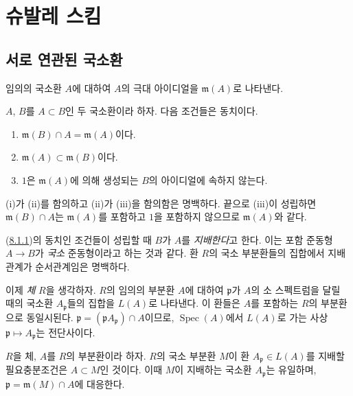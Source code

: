\section{슈발레 스킴}
\label{section:I.8-ko}

\subsection{서로 연관된 국소환}
\label{subsection:I.8.1-ko}

임의의 국소환 $A$에 대하여 $A$의 극대 아이디얼을
$\mathfrak m(A)$로 나타낸다.

\begin{lemma}[8.1.1]
\label{I.8.1.1-ko}
$A$, $B$를 $A\subset B$인 두 국소환이라 하자. 다음 조건들은
동치이다.
\begin{enumerate}
  \item[(i)] $\mathfrak m(B)\cap A=\mathfrak m(A)$이다.
  \item[(ii)] $\mathfrak m(A)\subset\mathfrak m(B)$이다.
  \item[(iii)] $1$은 $\mathfrak m(A)$에 의해 생성되는 $B$의
    아이디얼에 속하지 않는다.
\end{enumerate}
\end{lemma}

(i)가 (ii)를 함의하고 (ii)가 (iii)을 함의함은 명백하다. 끝으로
(iii)이 성립하면 $\mathfrak m(B)\cap A$는 $\mathfrak m(A)$를 포함하고
$1$을 포함하지 않으므로 $\mathfrak m(A)$와 같다.

(\hyperref[I.8.1.1-ko]{8.1.1})의 동치인 조건들이 성립할 때 $B$가
$A$를 \emph{지배한다}고 한다. 이는 포함 준동형 $A\to B$가
\emph{국소} 준동형이라고 하는 것과 같다. 환 $R$의 국소 부분환들의
집합에서 지배관계가 순서관계임은 명백하다.

\begin{env}[8.1.2]
\label{I.8.1.2-ko}
이제 \emph{체} $R$을 생각하자. $R$의 임의의 부분환 $A$에 대하여
$\mathfrak p$가 $A$의 소 스펙트럼을 달릴 때의 국소환
$A_\mathfrak p$들의 집합을 $L(A)$로 나타낸다. 이 환들은 $A$를
포함하는 $R$의 부분환으로 동일시된다.
$\mathfrak p=(\mathfrak p A_\mathfrak p)\cap A$이므로,
$\operatorname{Spec}(A)$에서 $L(A)$로 가는 사상
$\mathfrak p\mapsto A_\mathfrak p$는 전단사이다.
\end{env}

\begin{lemma}[8.1.3]
\label{I.8.1.3-ko}
$R$을 체, $A$를 $R$의 부분환이라 하자. $R$의 국소 부분환 $M$이
환 $A_\mathfrak p\in L(A)$를 지배할 필요충분조건은
$A\subset M$인 것이다. 이때 $M$이 지배하는 국소환
$A_\mathfrak p$는 유일하며,
$\mathfrak p=\mathfrak m(M)\cap A$에 대응한다.
\end{lemma}

